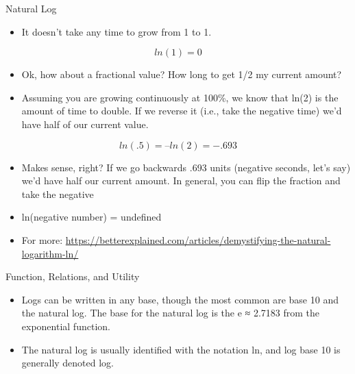 \documentclass[
  ignorenonframetext,
]{beamer}
\providecommand{\tightlist}{%
  \setlength{\itemsep}{0pt}\setlength{\parskip}{0pt}}
\begin{document}
\begin{frame}{Natural Log}
\protect\hypertarget{natural-log-1}{}

\begin{itemize}
\tightlist
\item
  It doesn't take any time to grow from 1 to 1.
\end{itemize}

\[ln(1) = 0\]

\begin{itemize}
\item
  Ok, how about a fractional value? How long to get 1/2 my current
  amount?
\item
  Assuming you are growing continuously at 100\%, we know that ln(2) is
  the amount of time to double. If we reverse it (i.e., take the
  negative time) we'd have half of our current value.
\end{itemize}

\[ln(.5) = – ln(2) = -.693\]

\begin{itemize}
\item
  Makes sense, right? If we go backwards .693 units (negative seconds,
  let's say) we'd have half our current amount. In general, you can flip
  the fraction and take the negative
\item
  ln(negative number) = undefined
\item
  For more:
  \url{https://betterexplained.com/articles/demystifying-the-natural-logarithm-ln/}
\end{itemize}

\end{frame}

\begin{frame}{Function, Relations, and Utility}
\protect\hypertarget{function-relations-and-utility-23}{}

\begin{itemize}
\item
  Logs can be written in any base, though the most common are base 10
  and the natural log. The base for the natural log is the e ≈ 2.7183
  from the exponential function.
\item
  The natural log is usually identified with the notation ln, and log
  base 10 is generally denoted log.
\end{itemize}

\end{frame}
\end{document}
